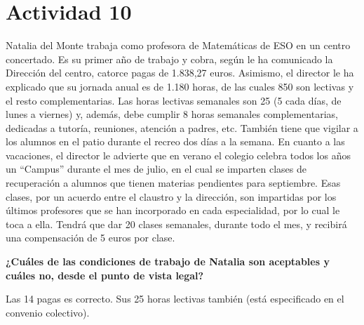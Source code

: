 \section{Actividad 10}

Natalia del Monte trabaja como profesora de Matemáticas de ESO en un centro concertado. Es su primer año de trabajo y cobra, según le ha comunicado la Dirección del centro, catorce pagas de 1.838,27 euros. Asimismo, el director le ha explicado que su jornada anual es de 1.180 horas, de las cuales 850 son lectivas y el resto complementarias. Las horas lectivas semanales son 25 (5 cada días, de lunes a viernes) y, además, debe cumplir 8 horas semanales complementarias, dedicadas a tutoría, reuniones, atención a padres, etc. También tiene que vigilar a los alumnos en el patio durante el recreo dos días a la semana. En cuanto a las vacaciones, el director le advierte que en verano el colegio celebra todos los años un “Campus” durante el mes de julio, en el cual se imparten clases de recuperación a alumnos que tienen materias pendientes para septiembre. Esas clases, por un acuerdo entre el claustro y la dirección, son impartidas por los últimos profesores que se han incorporado en cada especialidad, por lo cual le toca a ella. Tendrá que dar 20 clases semanales, durante todo el mes, y recibirá una compensación de 5 euros por clase.

\textbf{¿Cuáles de las condiciones de trabajo de Natalia son aceptables y cuáles no,
desde el punto de vista legal?}

Las 14 pagas es correcto. Sus 25 horas lectivas también (está especificado en el convenio colectivo). 
%
